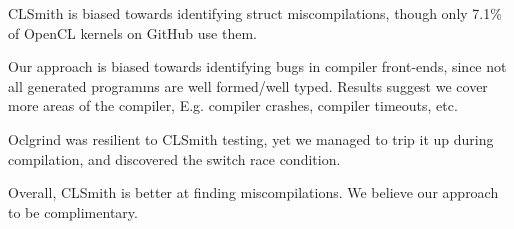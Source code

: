 CLSmith is biased towards identifying struct miscompilations, though only 7.1\% of OpenCL kernels on GitHub use them.

Our approach is biased towards identifying bugs in compiler front-ends, since not all generated programms are well formed/well typed. Results suggest we cover more areas of the compiler, E.g. compiler crashes, compiler timeouts, etc.

Oclgrind was resilient to CLSmith testing, yet we managed to trip it up during compilation, and discovered the switch race condition.

Overall, CLSmith is better at finding miscompilations. We believe our approach to be complimentary.

